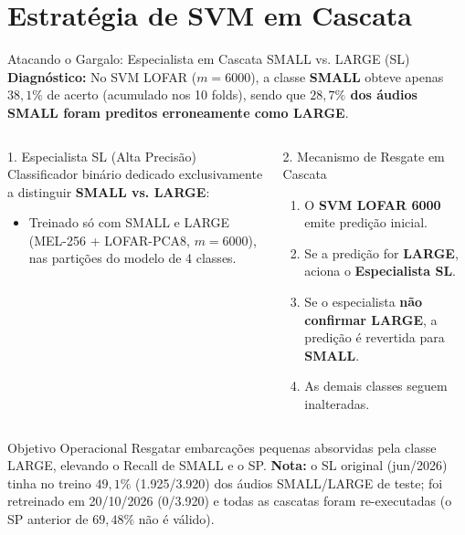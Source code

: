 \documentclass[aspectratio=169]{beamer}
\begin{document}
\section{Estrat\'{e}gia de SVM em Cascata}

\begin{frame}{Atacando o Gargalo: Especialista em Cascata SMALL vs. LARGE (SL)}
    \footnotesize
    \textbf{Diagn\'{o}stico:} No SVM LOFAR ($m=6000$), a classe \textbf{SMALL} obteve apenas $38,1\%$ de acerto (acumulado nos 10 folds), sendo que \textbf{$28,7\%$ dos \'{a}udios SMALL foram preditos erroneamente como LARGE}.
    
    \vspace{0.15cm}
    \begin{columns}[t]
        \begin{block}{\small 1. Especialista SL (Alta Precis\~{a}o)}
            \scriptsize
            Classificador bin\'{a}rio dedicado exclusivamente a distinguir \textbf{SMALL vs. LARGE}:
            \begin{itemize}
                \setlength{\itemsep}{1pt}
                \item Treinado s\'{o} com SMALL e LARGE (MEL-256 + LOFAR-PCA8, $m=6000$), nas parti\c{c}\~{o}es do modelo de 4 classes.
            \end{itemize}
        \end{block}
        
        \begin{block}{\small 2. Mecanismo de Resgate em Cascata}
            \scriptsize
            \begin{enumerate}
                \setlength{\itemsep}{1pt}
                \item O \textbf{SVM LOFAR 6000} emite predi\c{c}\~{a}o inicial.
                \item Se a predi\c{c}\~{a}o for \textbf{LARGE}, aciona o \textbf{Especialista SL}.
                \item Se o especialista \textbf{n\~{a}o confirmar LARGE}, a predi\c{c}\~{a}o \'{e} revertida para \textbf{SMALL}.
                \item As demais classes seguem inalteradas.
            \end{enumerate}
        \end{block}
    \end{columns}
    
    \vspace{0.15cm}
    \begin{alertblock}{\small Objetivo Operacional}
        \scriptsize
        Resgatar embarca\c{c}\~{o}es pequenas absorvidas pela classe LARGE, elevando o Recall de SMALL e o SP.
        \textbf{Nota:} o SL original (jun/2026) tinha no treino $49,1\%$ (1.925/3.920) dos \'{a}udios SMALL/LARGE de teste; foi retreinado em 20/10/2026 (0/3.920) e todas as cascatas foram re-executadas (o SP anterior de $69,48\%$ n\~{a}o \'{e} v\'{a}lido).
    \end{alertblock}
\end{frame}
\end{document}
